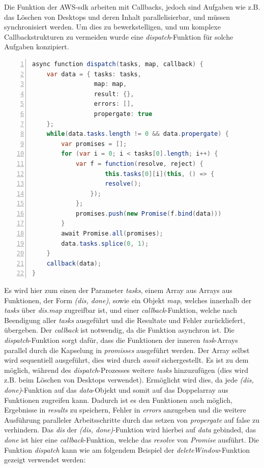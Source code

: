 \documentclass[a4paper, 12pt]{scrreprt}
\renewcommand\_{\textunderscore\allowbreak}
\begin{document}
Die Funktion der AWS-sdk arbeiten mit Callbacks, jedoch sind Aufgaben wie z.B. das Löschen von Desktops und deren Inhalt parallelisierbar, und müssen synchronisiert werden. Um dies zu bewerkstelligen, und um komplexe Callbackstrukturen zu vermeiden wurde eine \textit{dispatch}-Funktion für solche Aufgaben konzipiert. 
\bigskip
\begin{lstlisting}[xleftmargin=\parindent,numbers=left,numberstyle=\small,numbersep=8pt,frame=L,mathescape=true, basicstyle=\small, language=Java, lineskip={1.0pt}]
async function dispatch(tasks, map, callback) {
    var data = { tasks: tasks,
                 map: map, 
                 result: {}, 
                 errors: [], 
                 propergate: true 
    };
    while(data.tasks.length != 0 && data.propergate) {
        var promises = [];
        for (var i = 0; i < tasks[0].length; i++) {
            var f = function(resolve, reject) {
                    this.tasks[0][i](this, () => {
                    resolve();
                });
            };
            promises.push(new Promise(f.bind(data)))
        }
        await Promise.all(promises);
        data.tasks.splice(0, 1);
    }
    callback(data);
}
\end{lstlisting}
\bigskip
Es wird hier zum einen der Parameter \textit{tasks}, einem Array aus Arrays aus Funktionen, der Form \textit{(dis, done)}, sowie ein Objekt \textit{map}, welches innerhalb der \textit{tasks} über \textit{dis.map} zugreifbar ist, und einer \textit{callback}-Funktion, welche nach Beendigung aller \textit{tasks} ausgeführt und die Resultate und Fehler zurückliefert, übergeben. Der \textit{callback} ist notwendig, da die Funktion asynchron ist. Die \textit{dispatch}-Funktion sorgt dafür, dass die Funktionen der inneren \textit{task}-Arrays parallel durch die Kapselung in \textit{promisses} ausgeführt werden. Der Array selbst wird sequentiell ausgeführt, dies wird durch \textit{await} sichergestellt. Es ist zu dem möglich, während des \textit{dispatch}-Prozesses weitere \textit{tasks} hinzuzufügen (dies wird z.B. beim Löschen von Desktops verwendet). Ermöglicht wird dies, da jede \textit{(dis, done)}-Funktion auf das \textit{data}-Objekt und somit auf das Doppelarray aus Funktionen zugreifen kann. Dadurch ist es den Funktionen auch möglich, Ergebnisse in \textit{results} zu speichern, Fehler in \textit{errors} anzugeben und die weitere Ausführung paralleler Arbeitsschritte durch das setzen von \textit{propergate} auf false zu verhindern. Das \textit{dis} der \textit{(dis, done)}-Funktion wird hierbei auf \textit{data} gebinded, das \textit{done} ist hier eine \textit{callback}-Funktion, welche das \textit{resolve} von \textit{Promise} ausführt. Die Funktion \textit{dispatch} kann wie am folgendem Beispiel der \textit{deleteWindow}-Funktion gezeigt verwendet werden:
\end{document}
